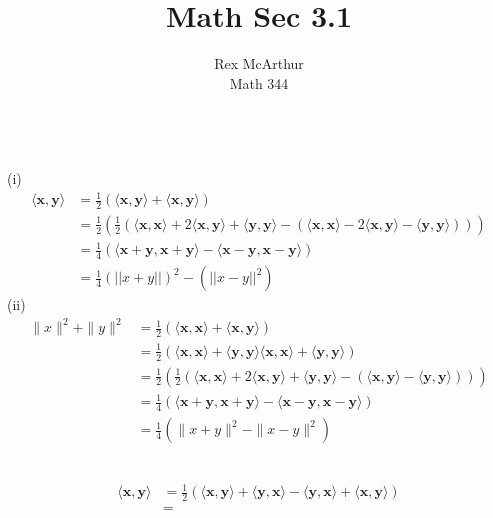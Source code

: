 \documentclass[letterpaper,12pt]{article}
\title{Math Sec 3.1}
\author{Rex McArthur\\Math 344}
\theoremstyle{definition}
\begin{document}
\maketitle
{}\\
(i)
\begin{align*}
    \langle \mathbf{x},\mathbf{y} \rangle & = \frac{1}{2} (\langle \mathbf{x},\mathbf{y} \rangle + \langle \mathbf{x},\mathbf{y} \rangle ) \\
    & = \frac{1}{2}(\frac{1}{2}(\langle \mathbf{x},\mathbf{x} \rangle + 2 \langle \mathbf{x},\mathbf{y} \rangle + \langle \mathbf{y},\mathbf{y} \rangle -( \langle \mathbf{x},\mathbf{x} \rangle  - 2 \langle \mathbf{x},\mathbf{y} \rangle -\langle \mathbf{y},\mathbf{y} \rangle ))) \\
    & = \frac{1}{4}( \langle \mathbf{x+y},\mathbf{x+y} \rangle - \langle \mathbf{x-y},\mathbf{x-y} \rangle ) \\
    & = \frac{1}{4} (||x + y||)^2 - (||x-y||^2)
\end{align*}
(ii)
\begin{align*}
    \|x\|^2 + \|y\|^2  &= \frac{1}{2}(\langle \mathbf{x},\mathbf{x} \rangle + \langle \mathbf{x},\mathbf{y} \rangle )     \\
    & = \frac{1}{2}(\langle \mathbf{x},\mathbf{x} \rangle + \langle \mathbf{y},\mathbf{y} \rangle \langle \mathbf{x},\mathbf{x} \rangle + \langle \mathbf{y},\mathbf{y} \rangle )\\
    & = \frac{1}{2}(\frac{1}{2}(\langle \mathbf{x},\mathbf{x} \rangle + 2 \langle \mathbf{x},\mathbf{y} \rangle + \langle \mathbf{y},\mathbf{y} \rangle - (\langle \mathbf{x},\mathbf{y} \rangle - \langle \mathbf{y},\mathbf{y} \rangle )))\\
    & = \frac{1}{4}(\langle \mathbf{x+y},\mathbf{x+y} \rangle - \langle \mathbf{x-y},\mathbf{x-y} \rangle ) \\
    & = \frac{1}{4}(\| x+y\|^2 - \|x-y\|^2)
\end{align*}

\\
\begin{align*}
    \langle \mathbf{x},\mathbf{y} \rangle & = \frac{1}{2}(\langle \mathbf{x},\mathbf{y} \rangle + \langle \mathbf{y},\mathbf{x} \rangle - \langle \mathbf{y},\mathbf{x} \rangle + \langle \mathbf{x},\mathbf{y} \rangle ) \\
    & = 
\end{align*}
\end{document}
